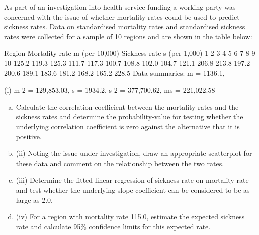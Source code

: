\documentclass[a4paper,12pt]{article}
\begin{document}
As part of an investigation into health service funding a working party was concerned with the issue of whether mortality rates could be used to predict sickness rates. Data on standardised mortality rates and standardised sickness rates were collected for a sample of 10 regions and are shown in the table below:

Region Mortality rate m (per 10,000) Sickness rate s (per 1,000)
1
2
3
4
5
6
7
8
9
10 125.2
119.3
125.3
111.7
117.3
100.7
108.8
102.0
104.7
121.1 206.8
213.8
197.2
200.6
189.1
183.6
181.2
168.2
165.2
228.5
Data summaries:
m = 1136.1,

(i)
m 2 = 129,853.03, s = 1934.2,
s 2 = 377,700.62, ms = 221,022.58

\begin{enumerate}[(a)]
\item Calculate the correlation coefficient between the mortality rates and the sickness rates and determine the probability-value for testing whether the underlying correlation coefficient is zero against the alternative that it is positive.

\item (ii) Noting the issue under investigation, draw an appropriate scatterplot for these data and comment on the relationship between the two rates.

\item (iii) Determine the fitted linear regression of sickness rate on mortality rate and test whether the underlying slope coefficient can be considered to be as large as 2.0.

\item (iv) For a region with mortality rate 115.0, estimate the expected sickness rate and calculate 95\% confidence limits for this expected rate.
\end{enumerate}
\newpage
\end{document}
